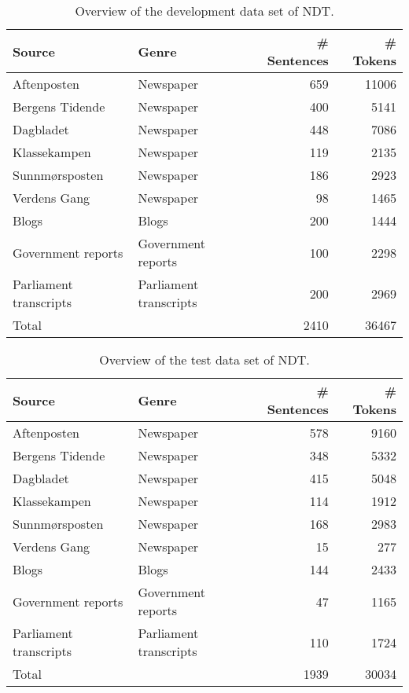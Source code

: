 \documentclass[a4paper,12pt,english]{book}
\begin{document}
\begin{table}
    \centering
    \smaller[0.5]
    \begin{tabular}{@{}llrr@{}}
        \toprule
        \textbf{Source} & \textbf{Genre} & \textbf{\# Sentences} &
        \textbf{\# Tokens} \\
        \midrule
        Aftenposten & Newspaper & 659 & 11006\\
        Bergens Tidende & Newspaper & 400 & 5141 \\
        Dagbladet & Newspaper & 448 & 7086 \\
        Klassekampen & Newspaper & 119 & 2135 \\
        Sunnmørsposten & Newspaper & 186 & 2923 \\
        Verdens Gang & Newspaper & 98 & 1465 \\
        Blogs & Blogs & 200 & 1444 \\
        Government reports & Government reports & 100 & 2298 \\
        Parliament transcripts & Parliament transcripts & 200 & 2969 \\
        \midrule
        Total & & 2410 & 36467 \\
        \bottomrule
    \end{tabular}
    \caption{Overview of the development data set of NDT.}
    \label{devdataset}
\end{table}

\begin{table}
    \vspace{1ex}
    \centering
    \smaller[0.5]
    \begin{tabular}{@{}llrr@{}}
        \toprule
        \textbf{Source} & \textbf{Genre} & \textbf{\# Sentences} &
        \textbf{\# Tokens} \\
        \midrule
        Aftenposten & Newspaper & 578 & 9160 \\
        Bergens Tidende & Newspaper & 348 & 5332 \\
        Dagbladet & Newspaper & 415 & 5048 \\
        Klassekampen & Newspaper & 114 & 1912 \\
        Sunnmørsposten & Newspaper & 168 & 2983 \\
        Verdens Gang & Newspaper & 15 & 277 \\
        Blogs & Blogs & 144 & 2433 \\
        Government reports & Government reports & 47 & 1165 \\
        Parliament transcripts & Parliament transcripts & 110 & 1724 \\
        \midrule
        Total & & 1939 & 30034 \\
        \bottomrule
    \end{tabular}
    \caption{Overview of the test data set of NDT.}
    \label{testdataset}
\end{table}
\end{document}
